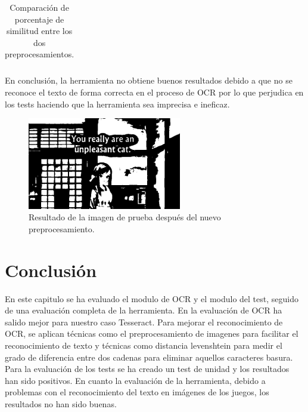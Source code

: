 \begin{table}[H]
\begin{tabular}{lll}
	\end{tabular}
	\caption{Comparación de porcentaje de similitud entre los dos preprocesamientos.}
	\label{table:simi}
\end{table}

En conclusión, la herramienta no obtiene buenos resultados debido a que no se reconoce el texto de forma correcta en el proceso de OCR por lo que perjudica en los tests haciendo que la herramienta sea imprecisa e ineficaz.
\begin{figure}[H]
	\centering
	\includegraphics[width = 0.6\textwidth]{Imagenes/Evaluacion_OCR/2_p.png}
	\caption{Resultado de la imagen de prueba después del nuevo preprocesamiento.}
	\label{fig:Eva_2PP}
\end{figure}
\section{Conclusión}
En este capitulo se ha evaluado el modulo de OCR y el modulo del test, seguido de una evaluación completa de la herramienta. En la evaluación de OCR ha salido mejor para nuestro caso Tesseract. Para mejorar el reconocimiento de OCR, se aplican técnicas como el preprocesamiento de imagenes para facilitar el reconocimiento de texto y técnicas como distancia levenshtein para medir el grado de diferencia entre dos cadenas para eliminar aquellos caracteres basura. Para la evaluación de los tests se ha creado un test de unidad y los resultados han sido positivos. En cuanto la evaluación de la herramienta, debido a problemas con el reconocimiento del texto en imágenes de los juegos, los resultados no han sido buenas.